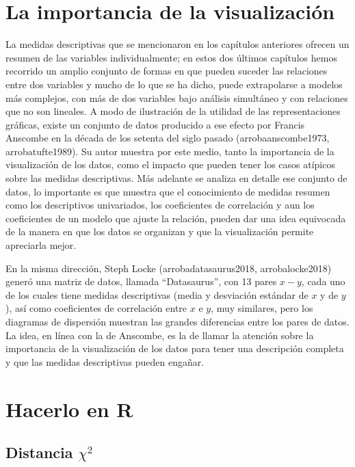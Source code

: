 \documentclass[]{book}
\begin{document}
\hypertarget{la-importancia-de-la-visualizaciuxf3n}{%
\section{La importancia de la visualización}\label{la-importancia-de-la-visualizaciuxf3n}}

La medidas descriptivas que se mencionaron en los capítulos anteriores ofrecen un resumen de las variables individualmente; en estos dos últimos capítulos hemos recorrido un amplio conjunto de formas en que pueden suceder las relaciones entre dos variables y mucho de lo que se ha dicho, puede extrapolarse a modelos más complejos, con más de dos variables bajo análisis simultáneo y con relaciones que no son lineales.
A modo de ilustración de la utilidad de las representaciones gráficas, existe un conjunto de datos producido a ese efecto por Francis Anscombe en la década de los setenta del siglo pasado (arrobaanscombe1973, arrobatufte1989). Su autor muestra por este medio, tanto la importancia de la visualización de los datos, como el impacto que pueden tener los casos atípicos sobre las medidas descriptivas. Más adelante se analiza en detalle ese conjunto de datos, lo importante es que muestra que el conocimiento de medidas resumen como los descriptivos univariados, los coeficientes de correlación y aun los coeficientes de un modelo que ajuste la relación, pueden dar una idea equivocada de la manera en que los datos se organizan y que la visualización permite apreciarla mejor.

En la misma dirección, Steph Locke (arrobadatasaurus2018, arrobalocke2018) generó una matriz de datos, llamada ``Datasaurus'', con 13 pares \(x-y\), cada uno de los cuales tiene medidas descriptivas (media y desviación estándar de \(x\) y de \(y\)), así como coeficientes de correlación entre \(x\) e \(y\), muy similares, pero los diagramas de dispersión muestran las grandes diferencias entre los pares de datos. La idea, en línea con la de Anscombe, es la de llamar la atención sobre la importancia de la visualización de los datos para tener una descripción completa y que las medidas descriptivas pueden engañar.

\hypertarget{hacerlo-en-r-3}{%
\section{Hacerlo en R}\label{hacerlo-en-r-3}}

\hypertarget{distancia-chi2}{%
\subsection{\texorpdfstring{Distancia \(\chi^{2}\)}{Distancia \textbackslash{}chi\^{}\{2\}}}\label{distancia-chi2}}
\end{document}
